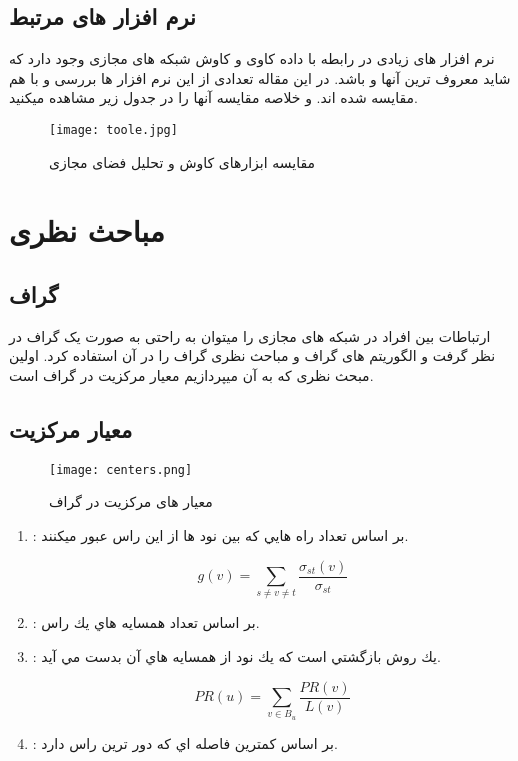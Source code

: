 \documentclass[12pt]{article}
\begin{document}
\subsection{نرم افزار های مرتبط}
نرم افزار های زیادی در رابطه با داده کاوی و کاوش شبکه های مجازی وجود دارد که شاید معروف ترین آنها 
و
باشد.
در این مقاله تعدادی از این نرم افزار ها بررسی و با هم مقایسه شده اند.
\cite{tools}
و خلاصه مقایسه آنها را در جدول زیر مشاهده میکنید.

\begin{figure}[htbp]
\centering
\texttt{[image: toole.jpg]}
\caption{مقایسه ابزارهای کاوش و تحلیل فضای مجازی}
\end{figure}


\section{مباحث نظری}
\subsection{گراف}
ارتباطات بین افراد در شبکه های مجازی را میتوان به راحتی به صورت یک گراف در نظر گرفت و الگوریتم های گراف و مباحث نظری گراف را در آن استفاده کرد.
اولین مبحث نظری که به آن میپردازیم معیار مرکزیت در گراف است.
\cite{center}

\subsection{معیار مرکزیت}

\begin{figure}[htbp]
\centering
\texttt{[image: centers.png]}
\caption{معیار های مرکزیت در گراف}
\end{figure}


\begin{enumerate}
\item
{}
:
 بر اساس تعداد راه هايي كه بين نود ها از اين راس عبور ميكنند.

\[
g(v) = \sum_{s\neq v \neq t} \frac{\sigma_{st}(v)}{\sigma_{st}}
\]

\item
{}
:
بر اساس تعداد همسايه هاي يك راس.

\item
{}
:
یك روش بازگشتي است كه 
 يك نود از 
  همسايه هاي آن بدست
مي آيد.

\[
PR(u) = \sum_{v \in B_u} \frac{PR(v)}{L(v)}
\]
\item
{}
:
بر اساس كمترين فاصله اي كه دور ترين راس دارد.


\end{enumerate}
\end{document}
